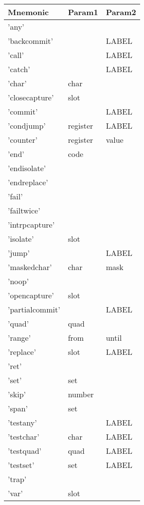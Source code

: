 
\begin{center}
\caption{Naigama Assembly Instructions}
\label{tab:naig_assembly}
\begin{longtable}{lll}
\textbf{Mnemonic} & \textbf{Param1} & \textbf{Param2} \\
\endhead
'any' &  &  \\
'backcommit' &  & LABEL \\
'call' &  & LABEL \\
'catch' &  & LABEL \\
'char' & char &  \\
'closecapture' & slot &  \\
'commit' &  & LABEL \\
'condjump' & register & LABEL \\
'counter' & register & value \\
'end' & code &  \\
'endisolate' &  &  \\
'endreplace' &  &  \\
'fail' &  &  \\
'failtwice' &  &  \\
'intrpcapture' &  &  \\
'isolate' & slot &  \\
'jump' &  & LABEL \\
'maskedchar' & char & mask \\
'noop' &  &  \\
'opencapture' & slot &  \\
'partialcommit' &  & LABEL \\
'quad' & quad &  \\
'range' & from & until \\
'replace' & slot & LABEL \\
'ret' &  &  \\
'set' & set &  \\
'skip' & number &  \\
'span' & set &  \\
'testany' &  & LABEL \\
'testchar' & char & LABEL \\
'testquad' & quad & LABEL \\
'testset' & set & LABEL \\
'trap' &  &  \\
'var' & slot &  \\
\end{longtable}
\end{center}
